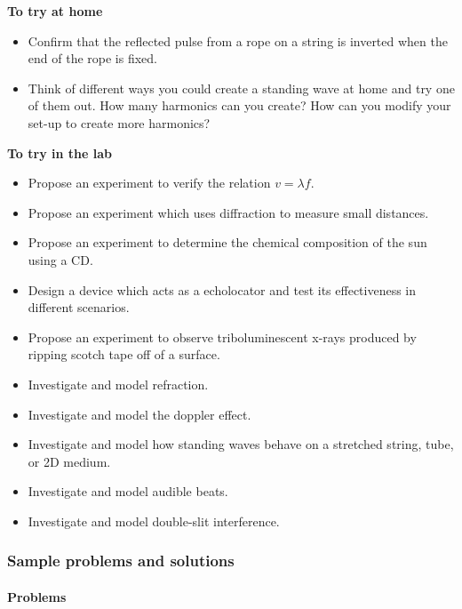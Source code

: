 \begin{framed}
\textbf{To try at home}\\
\begin{itemize}
\item Confirm that the reflected pulse from a rope on a string is inverted when the end of the rope is fixed.
\item Think of different ways you could create a standing wave at home and try one of them out. How many harmonics can you create? How can you modify your set-up to create more harmonics?
\end{itemize}
\end{framed}

\begin{framed}
\textbf{To try in the lab}\\
\begin{itemize}
\item Propose an experiment to verify the relation $v=\lambda f$.
\item Propose an experiment which uses diffraction to measure small distances.
\item Propose an experiment to determine the chemical composition of the sun using a CD.
\item Design a device which acts as a echolocator and test its effectiveness in different scenarios.
\item Propose an experiment to observe triboluminescent x-rays produced by ripping scotch tape off of a surface.
\item Investigate and model refraction.
\item Investigate and model the doppler effect.
\item Investigate and model how standing waves behave on a stretched string, tube, or 2D medium.
\item Investigate and model audible beats.
\item Investigate and model double-slit interference.
\end{itemize}
\end{framed}

\subsubsection{Sample problems and solutions}

\paragraph{Problems}\label{sec:problemswaves}

